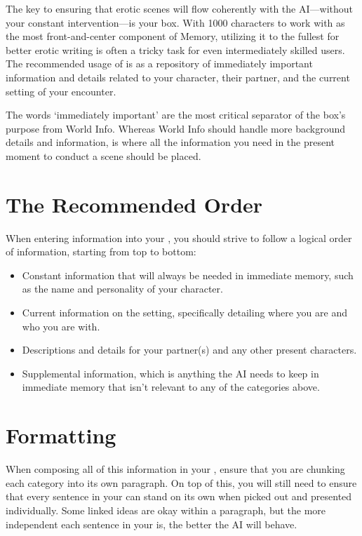 ﻿\documentclass[Coomer-main.tex]{subfiles}
\begin{document}
The key to ensuring that erotic scenes will flow coherently with the AI—without your constant intervention—is your \rem box.
With 1000 characters to work with as the most front-and-center component of Memory, utilizing it to the fullest for better erotic writing is often a tricky task for even intermediately skilled users.
The recommended usage of \rem is as a repository of immediately important information and details related to your character, their partner, and the current setting of your encounter.

The words ‘immediately important’ are the most critical separator of the \rem box's purpose from World Info.
Whereas World Info should handle more background details and information, \rem is where all the information you need in the present moment to conduct a scene should be placed.

\section{The Recommended Order}

When entering information into your \rem, you should strive to follow a logical order of information, starting from top to bottom:

\begin{itemize}
	
\item Constant information that will always be needed in immediate memory, such as the name and personality of your character.

\item Current information on the setting, specifically detailing where you are and who you are with.

\item Descriptions and details for your partner(s) and any other present characters.

\item Supplemental information, which is anything the AI needs to keep in immediate memory that isn't relevant to any of the categories above.

\end{itemize}

\section{Formatting}

When composing all of this information in your \rem, ensure that you are chunking each category into its own paragraph.
On top of this, you will still need to ensure that every sentence in your \rem can stand on its own when picked out and presented individually.
Some linked ideas are okay within a paragraph, but the more independent each sentence in your \rem is, the better the AI will behave.
\end{document}
